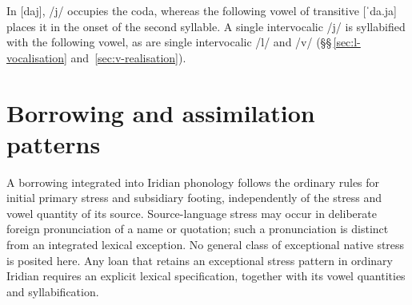 In  [daj], /j/ occupies the coda, whereas the following vowel
of transitive  [ˈda.ja] places it in the onset of the second
syllable. A single intervocalic /j/ is syllabified with the following
vowel, as are single intervocalic /l/ and /v/
(§§\,\ref{sec:l-vocalisation} and~\ref{sec:v-realisation}).


\section{Borrowing and assimilation patterns}\label{sec:loan-prosody}

A borrowing integrated into Iridian phonology follows the ordinary rules for
initial primary stress and subsidiary footing, independently of the stress and
vowel quantity of its source. Source-language stress may occur in deliberate foreign pronunciation of a name or quotation;
such a pronunciation is distinct from an integrated lexical exception. No general
class of exceptional native stress is posited here. Any loan that retains an
exceptional stress pattern in ordinary Iridian requires an explicit lexical
specification, together with its vowel quantities and syllabification.
